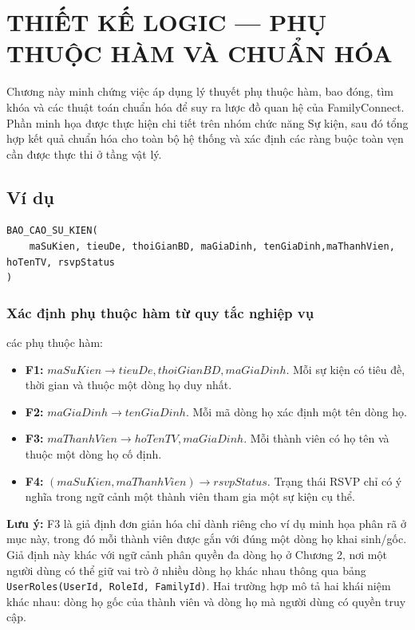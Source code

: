 \chapter{THIẾT KẾ LOGIC --- PHỤ THUỘC HÀM VÀ CHUẨN HÓA}

Chương này minh chứng việc áp dụng lý thuyết phụ thuộc hàm, bao đóng, tìm khóa và các thuật toán chuẩn hóa để suy ra lược đồ quan hệ của FamilyConnect. Phần minh họa được thực hiện chi tiết trên nhóm chức năng Sự kiện, sau đó tổng hợp kết quả chuẩn hóa cho toàn bộ hệ thống và xác định các ràng buộc toàn vẹn cần được thực thi ở tầng vật lý.

\section{Ví dụ}
\begin{infobox}
\begin{verbatim}
BAO_CAO_SU_KIEN(
    maSuKien, tieuDe, thoiGianBD, maGiaDinh, tenGiaDinh,maThanhVien, hoTenTV, rsvpStatus
)
\end{verbatim}
\end{infobox}
\subsection{Xác định phụ thuộc hàm từ quy tắc nghiệp vụ}
các phụ thuộc hàm:
\begin{itemize}
    \item \textbf{F1:} $maSuKien \rightarrow tieuDe, thoiGianBD, maGiaDinh$. Mỗi sự kiện có tiêu đề, thời gian và thuộc một dòng họ duy nhất.
    \item \textbf{F2:} $maGiaDinh \rightarrow tenGiaDinh$. Mỗi mã dòng họ xác định một tên dòng họ.
    \item \textbf{F3:} $maThanhVien \rightarrow hoTenTV, maGiaDinh$. Mỗi thành viên có họ tên và thuộc một dòng họ cố định.
    \item \textbf{F4:} $(maSuKien, maThanhVien) \rightarrow rsvpStatus$. Trạng thái RSVP chỉ có ý nghĩa trong ngữ cảnh một thành viên tham gia một sự kiện cụ thể.
\end{itemize}

\begin{infobox}
\textbf{Lưu ý:} F3 là giả định đơn giản hóa chỉ dành riêng cho ví dụ minh họa phân rã ở mục này, trong đó mỗi thành viên được gắn với đúng một dòng họ khai sinh/gốc. Giả định này khác với ngữ cảnh phân quyền đa dòng họ ở Chương 2, nơi một người dùng có thể giữ vai trò ở nhiều dòng họ khác nhau thông qua bảng \texttt{UserRoles(UserId, RoleId, FamilyId)}. Hai trường hợp mô tả hai khái niệm khác nhau: dòng họ gốc của thành viên và dòng họ mà người dùng có quyền truy cập.
\end{infobox}
